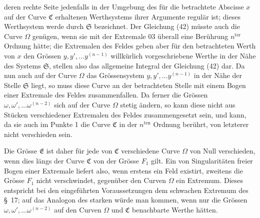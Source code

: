 \documentclass[11pt,a4paper,leqno]{article}
\begin{document}
deren rechte Seite jedenfalls in der Umgebung des für die betrachtete Abscisse $x$ auf der Curve $\mathfrak{C}$ erhaltenen Werthsystems ihrer Argumente regulär ist; dieses Werthsystem werde durch $\mathfrak{S}$ bezeichnet. Der Gleichung (42) müsste auch die Curve $\Omega$ genügen, wenn sie mit der Extremale 03 überall eine Berührung $n^{\mathrm{ter}}$ Ordnung hätte; die Extremalen des Feldes geben aber für den betrachteten Werth von $x$ den Grössen $y,y',\ldots y^{(n-1)}$ willkürlich vorgeschriebene Werthe in der Nähe des Systems $\mathfrak{S}$, stellen also das allgemeine Integral der Gleichung (42) dar. Da nun auch auf der Curve $\Omega$ das Grössensystem $y,y',\ldots y^{(n-1)}$ in der Nähe der Stelle $\mathfrak{S}$ liegt, so muss diese Curve an der betrachteten Stelle mit einem Bogen einer Extremale des Feldes zusammenfallen. Da ferner die Grössen $\omega,\omega',\ldots\omega^{(n-2)}$ sich auf der Curve $\Omega$ stetig ändern, so kann diese nicht aus Stücken verschiedener Extremalen des Feldes zusammengesetzt sein, und kann, da sie auch im Punkte 1 die Curve $\mathfrak{C}$ in der $n^{\mathrm{ten}}$ Ordnung berührt, von letzterer nicht verschieden sein.

Die Grösse $\mathfrak{E}$ ist daher für jede von $\mathfrak{C}$ verschiedene Curve $\Omega$ von Null verschieden, wenn dies längs der Curve $\mathfrak{C}$ von der
Grösse $F_1$ gilt. Ein von Singularitäten freier Bogen einer Extremale liefert also, wenn erstens ein Feld existirt, zweitens die Grösse $F_1$ nicht verschwindet, gegenüber den Curven $\Omega$ ein Extremum. Dieses entspricht bei den eingeführten Voraussetzungen dem schwachen Extremum des \S~17; auf das Analogon des starken würde man kommen, wenn nur die Grössen $\omega,\omega',\ldots\omega^{(n-2)}$ auf den Curven $\Omega$ und $\mathfrak{C}$ benachbarte Werthe hätten.
\end{document}
